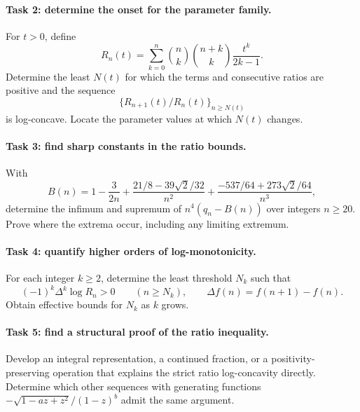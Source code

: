 \documentclass[11pt]{article}
\begin{document}
\newpage
\paragraph{Task 2: determine the onset for the parameter family.}
For \(t>0\), define
\[
 R_n(t)=\sum_{k=0}^n\binom nk\binom{n+k}k\frac{t^k}{2k-1}.
\]
Determine the least \(N(t)\) for which the terms and consecutive
ratios are positive and the sequence
\[
 \{R_{n+1}(t)/R_n(t)\}_{n\ge N(t)}
\]
is log-concave.
Locate the parameter values at which \(N(t)\) changes.

\paragraph{Task 3: find sharp constants in the ratio bounds.}
With
\[
 B(n)=1-\frac3{2n}
   +\frac{21/8-39\sqrt2/32}{n^2}
   +\frac{-537/64+273\sqrt2/64}{n^3},
\]
determine the infimum and supremum of
\(n^4(q_n-B(n))\) over integers \(n\ge20\).
Prove where the extrema occur, including any limiting extremum.

\paragraph{Task 4: quantify higher orders of log-monotonicity.}
For each integer \(k\ge2\), determine the least threshold \(N_k\)
such that
\[
 (-1)^k\Delta^k\log R_n>0\qquad(n\ge N_k),
 \qquad \Delta f(n)=f(n+1)-f(n).
\]
Obtain effective bounds for \(N_k\) as \(k\) grows.

\paragraph{Task 5: find a structural proof of the ratio inequality.}
Develop an integral representation, a continued fraction, or a
positivity-preserving operation that explains the strict ratio
log-concavity directly. Determine which other sequences with
generating functions
\(-\sqrt{1-az+z^2}/(1-z)^b\) admit the same argument.
\end{document}
